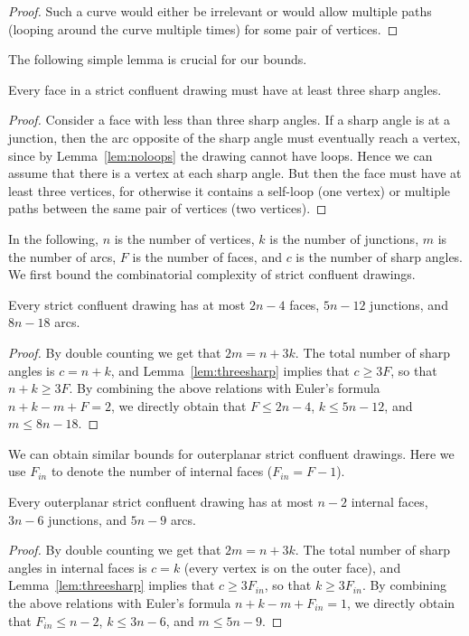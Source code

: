 \documentclass{llncs}
\begin{document}
\begin {proof}
  Such a curve would either be irrelevant or would allow multiple paths (looping around the curve multiple times) for some pair of vertices.
\end {proof}

The following simple lemma is crucial for our bounds.
\begin{lemma}\label{lem:threesharp}
Every face in a strict confluent drawing must have at least three sharp angles.
\end{lemma}
\begin{proof}
Consider a face with less than three sharp angles. If a sharp angle is at a junction, then the arc opposite of the sharp angle must eventually reach a vertex, since by Lemma~\ref {lem:noloops} the drawing cannot have loops. Hence we can assume that there is a vertex at each sharp angle. But then the face must have at least three vertices, for otherwise it contains a self-loop (one vertex) or multiple paths between the same pair of vertices (two vertices).
\end{proof}
In the following, $n$ is the number of vertices, $k$ is the number of junctions, $m$ is the number of arcs, $F$ is the number of faces, and $c$ is the number of sharp angles. We first bound the combinatorial complexity of strict confluent drawings.
\begin{lemma}\label{lem:boundplanar}
Every strict confluent drawing has at most $2n - 4$ faces, $5n - 12$ junctions, and $8n - 18$ arcs.
\end{lemma}
\begin{proof}
By double counting we get that $2m = n + 3k$. The total number of sharp angles is $c = n + k$, and Lemma~\ref{lem:threesharp} implies that $c \geq 3F$, so that $n + k \geq 3F$. By combining the above relations with Euler's formula $n + k - m + F = 2$, we directly obtain that $F \leq 2n - 4$, $k \leq 5n - 12$, and $m \leq 8n - 18$.
\end{proof}
We can obtain similar bounds for outerplanar strict confluent drawings. Here we use $F_{in}$ to denote the number of internal faces ($F_{in} = F - 1$).
\begin{lemma}\label{lem:boundouterplanar}
Every outerplanar strict confluent drawing has at most $n - 2$ internal faces, $3n - 6$ junctions, and $5n - 9$ arcs.
\end{lemma}
\begin{proof}
By double counting we get that $2m = n + 3k$. The total number of sharp angles in internal faces is $c = k$ (every vertex is on the outer face), and Lemma~\ref{lem:threesharp} implies that $c \geq 3F_{in}$, so that $k \geq 3F_{in}$. By combining the above relations with Euler's formula $n + k - m + F_{in} = 1$, we directly obtain that $F_{in} \leq n - 2$, $k \leq 3n - 6$, and $m \leq 5n - 9$.
\end{proof}
\end{document}
